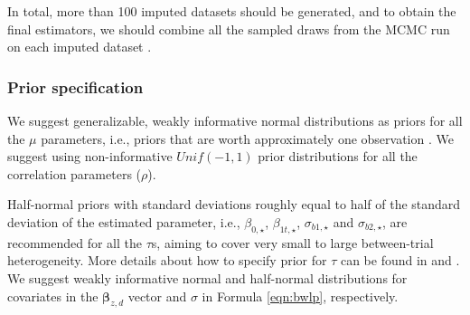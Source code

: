 In total, more than 100 imputed datasets should be generated, and to obtain the final estimators, we should combine all the sampled draws from the \ac{MCMC} run on each imputed dataset \citep{zhou2010note}.

\subsubsection{Prior specification}
We suggest generalizable, weakly informative normal distributions as priors for all the $\mu$ parameters, i.e., priors that are worth approximately one observation \citep{kass1995reference}. We suggest using non-informative $Unif(-1,1)$ prior distributions for all the correlation parameters ($\rho$).

Half-normal priors with standard deviations roughly equal to half of the standard deviation of the estimated parameter, i.e., $\beta_{0,\star}$, $\beta_{1t, \star}$, $\sigma_{b1, \star}$ and $\sigma_{b2, \star}$, are recommended for all the $\tau$s, aiming to cover very small to large between-trial heterogeneity. More details about how to specify prior for $\tau$ can be found in \cite{spiegelhalter2004bayesian} and \cite{gelman2006prior}. We suggest weakly informative normal and half-normal distributions for covariates in the $\boldsymbol{\beta}_{z,d}$ vector and $\sigma$ in Formula \ref{eqn:bwlp}, respectively. 


